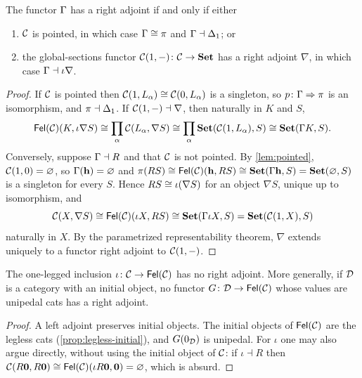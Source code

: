 \begin{proposition}\label{prop:Gamma-right}
The functor $\Gamma$ has a right adjoint if and only if either
\begin{enumerate}
\item $\mathcal{C}$ is pointed, in which case $\Gamma\cong\pi$ and $\Gamma\dashv\Delta_1$; or
\item the global-sections functor $\mathcal{C}(1,-)\colon\mathcal{C}\to\mathbf{Set}$ has a right
  adjoint $\nabla$, in which case $\Gamma\dashv\iota\nabla$.
\end{enumerate}
\end{proposition}

\begin{proof}
If $\mathcal{C}$ is pointed then $\mathcal{C}(1,L_\alpha)\cong\mathcal{C}(0,L_\alpha)$ is a singleton,
so $p\colon\Gamma\Rightarrow\pi$ is an isomorphism, and $\pi\dashv\Delta_1$.
If $\mathcal{C}(1,-)\dashv\nabla$, then naturally in $K$ and $S$,
\[
\mathsf{Fel}(\mathcal{C})(K,\iota\nabla S)\cong\prod_\alpha\mathcal{C}(L_\alpha,\nabla S)\cong\prod_\alpha\mathbf{Set}(\mathcal{C}(1,L_\alpha),S)\cong\mathbf{Set}(\Gamma K,S).
\]
Conversely, suppose $\Gamma\dashv R$ and that $\mathcal{C}$ is not pointed. By
\cref{lem:pointed}, $\mathcal{C}(1,0)=\varnothing$, so $\Gamma(\mathbf{h})=\varnothing$
and
$\pi(RS)\cong\mathsf{Fel}(\mathcal{C})(\mathbf{h},RS)\cong\mathbf{Set}(\Gamma\mathbf{h},S)=\mathbf{Set}(\varnothing,S)$
is a singleton for every $S$. Hence $RS\cong\iota(\nabla S)$ for an object
$\nabla S$, unique up to isomorphism, and
\[
\mathcal{C}(X,\nabla S)\cong\mathsf{Fel}(\mathcal{C})(\iota X,RS)\cong\mathbf{Set}(\Gamma\iota X,S)=\mathbf{Set}(\mathcal{C}(1,X),S)
\]
naturally in $X$. By the parametrized representability theorem, $\nabla$
extends uniquely to a functor right adjoint to $\mathcal{C}(1,-)$.
\end{proof}

\begin{proposition}\label{prop:iota-no-right}
The one-legged inclusion $\iota\colon\mathcal{C}\to\mathsf{Fel}(\mathcal{C})$ has no right adjoint.
More generally, if $\mathcal{D}$ is a category with an initial object, no functor
$G\colon\mathcal{D}\to\mathsf{Fel}(\mathcal{C})$ whose values are unipedal cats has a right adjoint.
\end{proposition}

\begin{proof}
A left adjoint preserves initial objects. The initial objects of $\mathsf{Fel}(\mathcal{C})$
are the legless cats (\cref{prop:legless-initial}), and $G(0_{\mathcal{D}})$ is
unipedal. For $\iota$ one may also argue directly, without using the initial
object of $\mathcal{C}$: if $\iota\dashv R$ then
$\mathcal{C}(R\mathbf{0},R\mathbf{0})\cong\mathsf{Fel}(\mathcal{C})(\iota R\mathbf{0},\mathbf{0})=\varnothing$,
which is absurd.
\end{proof}

